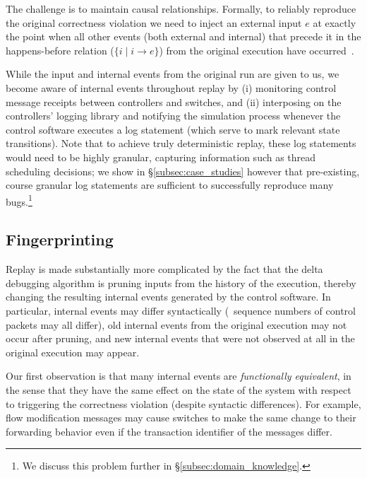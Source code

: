The challenge is to maintain causal relationships.
Formally, to reliably reproduce the original correctness violation
we need to
inject an external input $e$ at exactly the point when all other
events (both external and internal) that precede it in the happens-before
relation ($\{i \mid i \rightarrow e\}$) from the original execution have
occurred~\cite{tel2000introduction}.

While the input and internal events from the original run are given to us,
we become aware of internal events throughout replay by
(i) monitoring
control message receipts between controllers and switches,
and (ii) interposing on the controllers' logging library and notifying the
simulation process whenever the control software executes a log statement (which serve to mark relevant state
transitions). Note that to achieve truly deterministic
replay, these log statements would need to
be highly granular, capturing information such as thread scheduling decisions;
we show in \S\ref{subsec:case_studies}
however that pre-existing, course granular log statements are sufficient to
successfully reproduce \num{many} bugs.\footnote{We discuss this problem further in
\S\ref{subsec:domain_knowledge}.}

\subsection{Fingerprinting}
\label{subsec:fingerprinting}

Replay is made substantially more complicated by the fact
that the delta debugging algorithm is pruning inputs from the history of the
execution, thereby changing the resulting internal events generated by the control
software. In particular, internal events may differ syntactically (\eg~sequence numbers
of control packets may all differ), old internal events from the original
execution may not occur after pruning, and new internal events that were not
observed at all in the original execution may appear.

Our first observation is that many internal events are {\em functionally
equivalent}, in the sense that they
have the same effect on the state of the system with respect to triggering the
correctness violation (despite syntactic differences). For example, flow
modification messages may cause switches to make the same change to their forwarding behavior
even if the transaction identifier of the messages differ.

